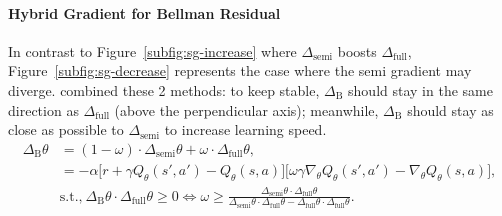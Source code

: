 \documentclass{article} %
\begin{document}
\paragraph{Hybrid Gradient for Bellman Residual} In contrast to Figure~\ref{subfig:sg-increase} where $\Delta_\text{semi}$ boosts $\Delta_\text{full}$, Figure~\ref{subfig:sg-decrease} represents the case where the semi gradient may diverge. \cite{baird1995residual} combined these 2 methods: to keep stable, $\Delta_\text{B}$ should stay in the same direction as $\Delta_\text{full}$ (above the perpendicular axis); meanwhile, $\Delta_\text{B}$ should stay as close as possible to $\Delta_\text{semi}$ to increase learning speed.
\begin{equation}
\begin{aligned}
	\Delta_\text{B} \theta &= (1 - \omega)  \cdot \Delta_\text{semi}\theta + \omega \cdot \Delta_\text{full}\theta, \\
	&=-\alpha \Big[ r + \gamma Q_\theta(s', a') - Q_\theta(s, a) \Big] \Big[\omega \gamma \nabla_\theta Q_\theta(s', a') - \nabla_\theta Q_\theta(s, a) \Big],\\
	&\text{s.t.,} \ \Delta_\text{B}\theta \cdot \Delta_\text{full}\theta\geqslant 0 \Leftrightarrow \omega \geqslant \frac{\Delta_\text{semi}\theta \cdot \Delta_\text{full}\theta}{\Delta_\text{semi}\theta \cdot \Delta_\text{full}\theta - \Delta_\text{full}\theta \cdot \Delta_\text{full}\theta}.
\end{aligned} 
\end{equation}
\end{document}
